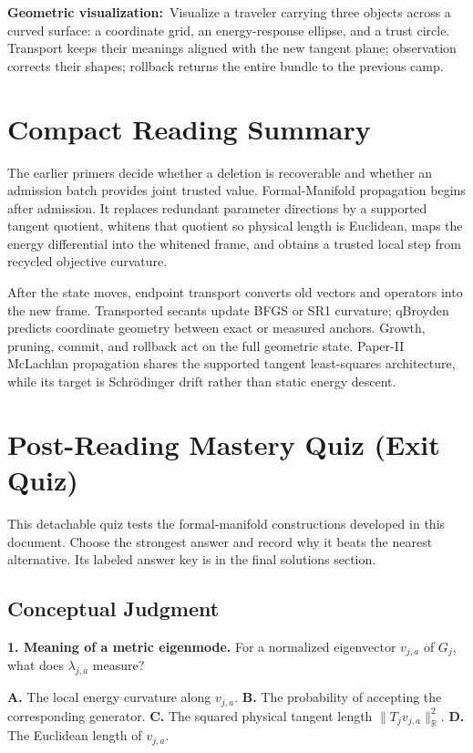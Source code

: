\documentclass[10pt,twocolumn]{article}
\newcommand{\geom}[1]{\par\noindent\textbf{Geometric visualization:}\ \textcolor{teal!70!black}{#1}\par}
\begin{document}
\geom{Visualize a traveler carrying three objects across a curved surface: a
coordinate grid, an energy-response ellipse, and a trust circle. Transport
keeps their meanings aligned with the new tangent plane; observation corrects
their shapes; rollback returns the entire bundle to the previous camp.}

\section*{Compact Reading Summary}

The earlier primers decide whether a deletion is recoverable and whether an
admission batch provides joint trusted value. Formal-Manifold propagation begins
after admission. It replaces redundant parameter directions by a supported
tangent quotient, whitens that quotient so physical length is Euclidean, maps
the energy differential into the whitened frame, and obtains a trusted local
step from recycled objective curvature.

After the state moves, endpoint transport converts old vectors and operators
into the new frame. Transported secants update BFGS or SR1 curvature; qBroyden
predicts coordinate geometry between exact or measured anchors. Growth,
pruning, commit, and rollback act on the full geometric state. Paper-II
McLachlan propagation shares the supported tangent least-squares architecture,
while its target is Schr\"odinger drift rather than static energy descent.

\clearpage
\section*{Post-Reading Mastery Quiz (Exit Quiz)}

This detachable quiz tests the formal-manifold constructions developed in this
document. Choose the strongest answer and record why it beats the nearest
alternative. Its labeled answer key is in the final solutions section.

\subsection*{Conceptual Judgment}

\textbf{1. Meaning of a metric eigenmode.}
For a normalized eigenvector \(v_{j,a}\) of \(G_j\), what does
\(\lambda_{j,a}\) measure?

\textbf{A.} The local energy curvature along \(v_{j,a}\).\quad
\textbf{B.} The probability of accepting the corresponding generator.\quad
\textbf{C.} The squared physical tangent length
\(\|T_jv_{j,a}\|_{\mathbb R}^2\).\quad
\textbf{D.} The Euclidean length of \(v_{j,a}\).
\end{document}
